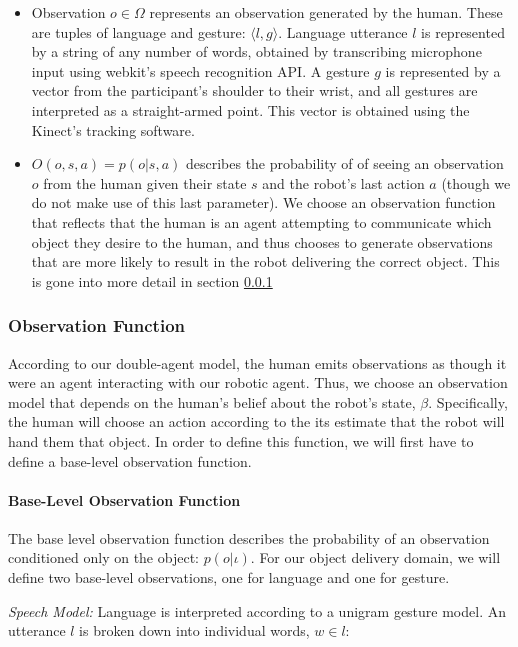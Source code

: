 \documentclass{article}
\begin{document}
\begin{itemize}
	\item Observation $o \in \Omega$ represents an observation generated by the human. These are tuples of language and gesture: $\langle l, g \rangle$. Language utterance $l$ is represented by a string of any number of words, obtained by transcribing microphone input using webkit's speech recognition API.  A gesture $g$ is represented by a vector from the participant's shoulder to their wrist, and all gestures are interpreted as a straight-armed point. This vector is obtained using the Kinect's tracking software. 
	\item $O(o, s, a) = p(o |s, a)$ describes the probability of of seeing an observation $o$ from the human given their state $s$ and the robot's last action $a$ (though we do not make use of this last parameter). We choose an observation function that reflects that the human is an agent attempting to communicate which object they desire to the human, and thus chooses to generate observations that are more likely to result in the robot delivering the correct object. This is gone into more detail in section \ref{sssec:of}
\end{itemize}


\subsubsection{Observation Function} \label{sssec:of}

According to our double-agent model, the human emits observations as though it were an agent interacting with our robotic agent. Thus, we choose an observation model that depends on the human's belief about the robot's state, $\beta$. Specifically, the human will choose an action according to the its estimate that the robot will hand them that object. In order to define this function, we will first have to define a base-level observation function. 

\paragraph{Base-Level Observation Function}

The base level observation function describes the probability of an observation conditioned only on the object: $p(o|\iota)$. For our object delivery domain, we will define two base-level observations, one for language and one for gesture. 

\noindent\textit{Speech Model:} Language is interpreted according to a unigram gesture model. An utterance $l$ is broken down into individual words, $w \in l$: 
\end{document}
